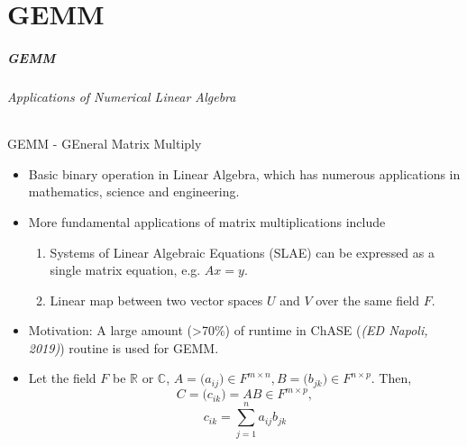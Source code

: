\part{GEMM}
\makepart

\begin{frame}
\frametitle{GEMM}
\framesubtitle{Applications of Numerical Linear Algebra}
GEMM - GEneral Matrix Multiply
\begin{itemize}
 \item Basic binary operation in Linear Algebra, which has numerous applications in mathematics, science and engineering.
 \item More fundamental applications of matrix multiplications include
  \begin{enumerate}
   \item Systems of Linear Algebraic Equations (SLAE) can be expressed as a single matrix equation, e.g. \(Ax = y\). 
   \item Linear map between two vector spaces \(U\) and \(V\) over the same field \(F\).
  \end{enumerate}
 \item Motivation: A large amount (>70\%) of runtime in ChASE (\emph{(ED Napoli, 2019)}) routine is used for GEMM.
 \item Let the field \(F\) be \(\mathbb{R}\) or \(\mathbb{C}\), \(A =\big( a_{ij} \big) \in F^{m \times n}, B =\big( b_{jk} \big) \in F^{n \times p}\). Then,
 \begin{equation}
  C=\big( c_{ik} \big)=AB \in F^{m \times p},
 \end{equation}
 \begin{equation}
  c_{ik} = \sum_{j=1}^n{a_{ij}b_{jk}}
 \end{equation}
\end{itemize}
\end{frame}


